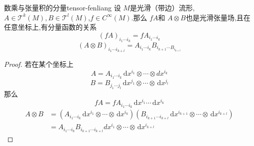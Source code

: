 \documentclass[../../几何与拓扑.tex]{subfiles}
\begin{document}
\begin{proposition}{数乘与张量积的分量}{tensor-fenliang}
    设 $ M $是光滑（带边）流形,$ A\in \mathscr{T}^{k}\left( M \right),B\in \mathscr{T}^{l}\left( M \right)   $,$ f\in C^{\infty}\left( M \right)  $.那么 $ fA $和 $ A\otimes B $也是光滑张量场,且在任意坐标上,有分量函数的关系 $$
    \left( fA \right)_{i_1\cdots i_{k}}=fA_{i_1\cdots i_{k}} 
    $$ $$
    \left( A\otimes B \right)_{i_1\cdots i_{k+ l}} =A_{i_1\cdots i_{k}}B_{i_{k+ 1}\cdots B_{i_{k+ l}}}
    $$     
\end{proposition}
\begin{proof}
    若在某个坐标上 $$
    A= A_{i_1\cdots i_{k}}\,\mathrm{d} x^{i_1}\otimes \cdots \otimes dx^{i_{k}}
    $$ $$
    B= B_{j_1\cdots j_{l}} \,\mathrm{d} x^{j_1}\otimes \cdots \otimes \,\mathrm{d} x^{j_{l}}
    $$那么 $$
    fA= fA_{i_1\cdots i_{k}} \,\mathrm{d} x^{i_1}\cdots \,\mathrm{d} x^{i_{k}}
    $$ $$
    \begin{aligned}
        A\otimes B&= \left( A_{i_1\cdots i_{k}} \,\mathrm{d} x^{i_1}\otimes \cdots \otimes \,\mathrm{d} x^{i_{k}}\right)\left( B_{i_{k+ 1}\cdots i_{k+ l}} \,\mathrm{d} x^{i_{k+ 1}} \otimes \cdots \otimes \,\mathrm{d} x^{i_{k+ l}}\right)   \\ 
         & = A_{i_1\cdots i_{k}}B_{i_{k+ 1}\cdots i_{k+ l   }} dx^{i_1}\otimes \cdots \otimes \,\mathrm{d} x^{i_{k+ l}}
    \end{aligned}
    $$ 
\end{proof}
\end{document}
